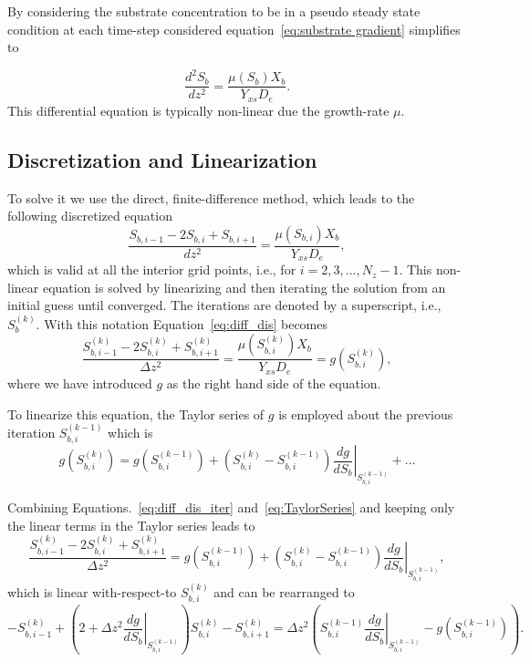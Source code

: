 \documentclass[letterpaper, twoside]{article}
\numberwithin{equation}{section}
\newcommand{\ie}{i.e.}
\begin{document}
By considering the substrate concentration to be in a pseudo steady state condition at each time-step considered equation~\ref {eq:substrate gradient} simplifies to 

\begin{equation} \label{eq:diffusion}
  \frac{d^2 S_b}{dz^2} = \frac{\mu(S_b) X_b}{Y_{xs} D_e}.
\end{equation}
This differential equation is typically non-linear due the growth-rate $\mu$.

\subsection{Discretization and Linearization}
To solve it we use the direct, finite-difference method, which leads to the following discretized equation
\begin{equation} \label{eq:diff_dis}
  \frac{ S_{b,i-1} - 2 S_{b,i} + S_{b,i+1}}{dz^2} = \frac{\mu(S_{b,i}) X_b}{Y_{xs} D_e},
\end{equation}
which is valid at all the interior grid points, \ie, for $i=2,3,\dots,N_z-1$. 
This non-linear equation is solved by linearizing and then iterating the solution from an initial guess until converged.
The iterations are denoted by a superscript, \ie, $S_{b}^{(k)}$.  With this notation Equation~\ref{eq:diff_dis} becomes
\begin{equation} \label{eq:diff_dis_iter}
  \frac{ S_{b,i-1}^{(k)} - 2 S_{b,i}^{(k)} + S_{b,i+1}^{(k)}}{\Delta z^2} = \frac{\mu\left(S_{b,i}^{(k)}\right) X_b}{Y_{xs} D_e} =  g\left(S_{b,i}^{(k)}\right),
\end{equation}
where we have introduced $g$ as the right hand side of the equation.

To linearize this equation, the Taylor series of $g$ is employed about the previous iteration $S_{b,i}^{(k-1)}$ which is
\begin{equation}\label{eq:TaylorSeries}
  g\left(S_{b,i}^{(k)}\right) =   g\left(S_{b,i}^{(k-1)}\right) + \left( S_{b,i}^{(k)} - S_{b,i}^{(k-1)}\right) \left.\frac{d g}{d S_b}\right|_{S_{b,i}^{(k-1)}} + \dots
\end{equation}

Combining Equations.~\ref{eq:diff_dis_iter} and~\ref{eq:TaylorSeries} and keeping only the linear terms in the Taylor series leads to
\begin{equation} \label{eq:diff_linear}
  \frac{ S_{b,i-1}^{(k)} - 2 S_{b,i}^{(k)} + S_{b,i+1}^{(k)}}{\Delta z^2} =  g\left(S_{b,i}^{(k-1)}\right) + \left( S_{b,i}^{(k)} - S_{b,i}^{(k-1)}\right) \left.\frac{d g}{d S_b}\right|_{S_{b,i}^{(k-1)}},
\end{equation}
which is linear with-respect-to $S_{b,i}^{(k)}$ and can be rearranged to
\begin{equation}
  \label{eq:diff_final}
  -S_{b,i-1}^{(k)} + \left( 2 +\Delta z^2\left.\frac{d g}{d S_b}\right|_{S_{b,i}^{(k-1)}}\right) S_{b,i}^{(k)} - S_{b,i+1}^{(k)}
  = \Delta z^2\left( S_{b,i}^{(k-1)} \left.\frac{d g}{d S_b}\right|_{S_{b,i}^{(k-1)}} - g\left(S_{b,i}^{(k-1)}\right)\right) .
\end{equation}
\end{document}
